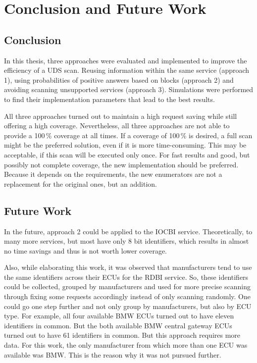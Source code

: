 \chapter{Conclusion and Future Work}

\section{Conclusion}

In this thesis, three approaches were evaluated and implemented to improve the efficiency of a UDS scan. Reusing information within the same service (approach 1), using probabilities of positive answers based on blocks (approach 2) and avoiding scanning unsupported services (approach 3). Simulations were performed to find their implementation parameters that lead to the best results.

All three approaches turned out to maintain a high request saving while still offering a high coverage.
Nevertheless, all three approaches are not able to provide a 100\,\% coverage at all times. 
If a coverage of 100\,\% is desired, a full scan might be the preferred solution, even if it is more time-consuming. This may be acceptable, if this scan will be executed only once. For fast results and good, but possibly not complete coverage, the new implementation should be preferred. Because it depends on the requirements, the new enumerators are not a replacement for the original ones, but an addition.

\section{Future Work}

In the future, approach 2 could be applied to the IOCBI service. Theoretically, to many more services, but most have only 8 bit identifiers, which results in almost no time savings and thus is not worth lower coverage.

Also, while elaborating this work, it was observed that manufacturers tend to use the same identifiers across their ECUs for the RDBI service. So, these identifiers could be collected, grouped by manufacturers and used for more precise scanning through fixing some requests accordingly instead of only scanning randomly. One could go one step further and not only group by manufacturers, but also by ECU type.
For example, all four available BMW ECUs turned out to have eleven identifiers in common. But the both available BMW central gateway ECUs turned out to have 61 identifiers in common. But this approach requires more data. For this work, the only manufacturer from which more than one ECU was available was BMW. This is the reason why it was not pursued further.

